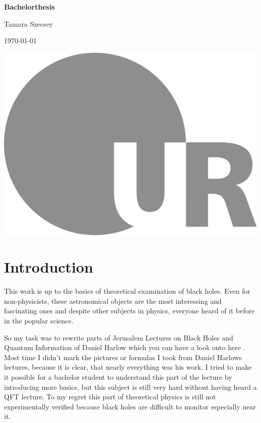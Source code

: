 \documentclass[english, a4, 12pt]{scrartcl}
\begin{document}

	\begin{titlepage}
		\begin{minipage}[c][\textheight][c]{\textwidth}
			\begin{center}
				{ \Huge \textbf{Bachelorthesis} }
				
				\vspace*{1cm}
				{\Large Tamara Szecsey}
				
				\vspace*{1cm}
				{\Large \today}
				
				\vspace*{4cm}
				\hspace*{1cm} \includegraphics[height=30ex]{LOGO_UR}
			\end{center}
		\end{minipage}
	\end{titlepage}
	
\thispagestyle{empty}
\tableofcontents	
\clearpage	
\setcounter{page}{1}
\section{Introduction}
	This work is up to the basics of theoretical examination of black holes. Even for non-physicists, these astronomical objects are the most interessing and fascinating ones and despite other subjects in physics, everyone heard of it before in the popular science.
	
	So my task was to rewrite parts of Jerusalem Lectures on Black Holes and Quantum Information of Daniel Harlow which you can have a look onto here \cite{JerusalemLectures}. Most time I didn't mark the pictures or formulas I took from Daniel Harlows lectures, because it is clear, that nearly everything was his work. I tried to make it possible for a bachelor student to understand this part of the lecture by introducing more basics, but this subject is still very hard without having heard a QFT lecture. To my regret this part of theoretical physics is still not experimentally verified because black holes are difficult to monitor especially near it. 
	
\end{document}

